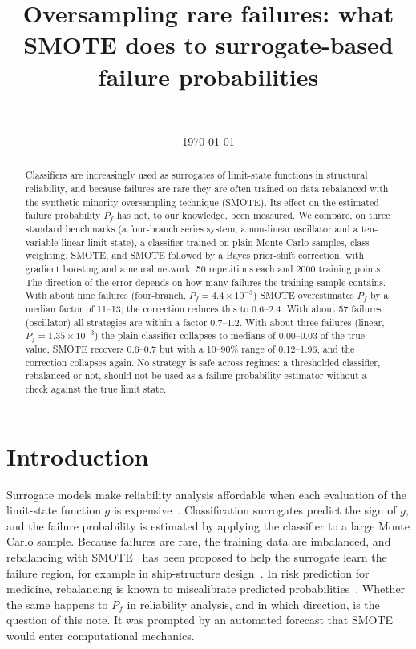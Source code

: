 \documentclass[11pt]{article}
\title{Oversampling rare failures: what SMOTE does to surrogate-based\\ failure probabilities}
\author{\authorname\\ \small \affiliation}
\date{\today}
\begin{document}
\maketitle

\begin{abstract}
Classifiers are increasingly used as surrogates of limit-state functions in structural reliability, and because
failures are rare they are often trained on data rebalanced with the synthetic minority oversampling technique
(SMOTE). Its effect on the estimated failure probability $P_f$ has not, to our knowledge, been measured. We compare,
on three standard benchmarks (a four-branch series system, a non-linear oscillator and a ten-variable linear limit
state), a classifier trained on plain Monte Carlo samples, class weighting, SMOTE, and SMOTE followed by a Bayes
prior-shift correction, with gradient boosting and a neural network, 50 repetitions each and 2000 training points.
The direction of the error depends on how many failures the training sample contains. With about nine failures
(four-branch, $P_f=4.4\times10^{-3}$) SMOTE overestimates $P_f$ by a median factor of 11--13; the correction reduces
this to 0.6--2.4. With about 57 failures (oscillator) all strategies are within a factor 0.7--1.2. With about three
failures (linear, $P_f=1.35\times10^{-3}$) the plain classifier collapses to medians of 0.00--0.03 of the true value,
SMOTE recovers 0.6--0.7 but with a 10--90\% range of 0.12--1.96, and the correction collapses again. No strategy is
safe across regimes: a thresholded classifier, rebalanced or not, should not be used as a failure-probability
estimator without a check against the true limit state.
\end{abstract}

\section{Introduction}
Surrogate models make reliability analysis affordable when each evaluation of the limit-state function $g$ is
expensive~\cite{Sudret}. Classification surrogates predict the sign of $g$, and the failure probability is estimated
by applying the classifier to a large Monte Carlo sample. Because failures are rare, the training data are
imbalanced, and rebalancing with SMOTE~\cite{Chawla} has been proposed to help the surrogate learn the failure region,
for example in ship-structure design~\cite{Ship}. In risk prediction for medicine, rebalancing is known to miscalibrate
predicted probabilities~\cite{vandenGoorbergh}. Whether the same happens to $P_f$ in reliability analysis, and in
which direction, is the question of this note. It was prompted by an automated forecast that SMOTE would enter
computational mechanics.
\end{document}
